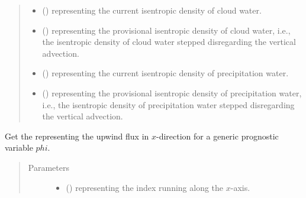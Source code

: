 \documentclass[letterpaper,10pt,english]{sphinxmanual}
\begin{document}
\begin{fulllineitems}
\begin{fulllineitems}
\begin{quote}
\begin{description}
\begin{itemize}
\item {} 
 () \textendash{}  representing the current isentropic density of cloud water.

\item {} 
 () \textendash{}  representing the provisional isentropic density of cloud water,
i.e., the isentropic density of cloud water stepped disregarding the vertical advection.

\item {} 
 () \textendash{}  representing the current isentropic density of precipitation water.

\item {} 
 () \textendash{}  representing the provisional isentropic density of precipitation water,
i.e., the isentropic density of precipitation water stepped disregarding the vertical advection.

\end{itemize}

\end{description}\end{quote}

\end{fulllineitems}


\begin{fulllineitems}
\label{\detokenize{api:dycore.flux_isentropic_upwind.FluxIsentropicUpwind._get_upwind_flux_x}}
Get the  representing the upwind flux in \(x\)-direction
for a generic prognostic variable \(phi\).
\begin{quote}\begin{description}
\item[{Parameters}] \leavevmode\begin{itemize}
\item {} 
 () \textendash{}  representing the index running along the \(x\)-axis.


\end{itemize}
\end{description}
\end{quote}
\end{fulllineitems}
\end{fulllineitems}
\end{document}
